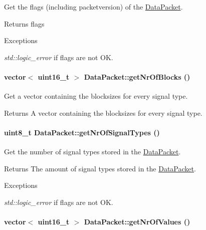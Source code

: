 Get the flags (including packetversion) of the \hyperlink{class_data_packet}{DataPacket}. \begin{DoxyReturn}{Returns}
flags 
\end{DoxyReturn}

\begin{DoxyExceptions}{Exceptions}
\item[{\em std::logic\_\-error}]if flags are not OK. \end{DoxyExceptions}
\hypertarget{class_data_packet_a73d518fa486ca53a334a061187063be7}{
\paragraph[{getNrOfBlocks}]{\setlength{\rightskip}{0pt plus 5cm}vector$<$ uint16\_\-t $>$ DataPacket::getNrOfBlocks ()}\hfill}
\label{class_data_packet_a73d518fa486ca53a334a061187063be7}


Get a vector containing the blocksizes for every signal type. \begin{DoxyReturn}{Returns}
A vector containing the blocksizes for every signal type. 
\end{DoxyReturn}
\hypertarget{class_data_packet_ad86138bd32d1dd9b44fda5b830b6cd6a}{
\paragraph[{getNrOfSignalTypes}]{\setlength{\rightskip}{0pt plus 5cm}uint8\_\-t DataPacket::getNrOfSignalTypes ()}\hfill}
\label{class_data_packet_ad86138bd32d1dd9b44fda5b830b6cd6a}


Get the number of signal types stored in the \hyperlink{class_data_packet}{DataPacket}. \begin{DoxyReturn}{Returns}
The amount of signal types stored in the \hyperlink{class_data_packet}{DataPacket}. 
\end{DoxyReturn}

\begin{DoxyExceptions}{Exceptions}
\item[{\em std::logic\_\-error}]if flags are not OK. \end{DoxyExceptions}
\hypertarget{class_data_packet_a42a952fa11cc5247ce65e8a124eddcac}{
\paragraph[{getNrOfValues}]{\setlength{\rightskip}{0pt plus 5cm}vector$<$ uint16\_\-t $>$ DataPacket::getNrOfValues ()}\hfill}
\label{class_data_packet_a42a952fa11cc5247ce65e8a124eddcac}


